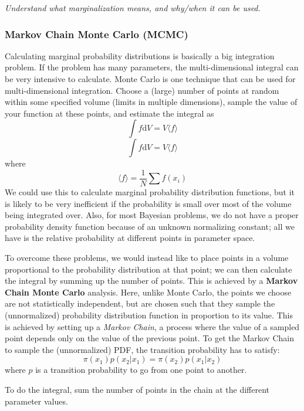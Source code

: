 \documentclass{article}
\newcommand{\test}[1]{%
    \begin{center}
        \colorbox{hl}{\parbox{0.9\textwidth}{\emph{\centering #1}}}
    \end{center}}
\begin{document}
\test{Understand what marginalization means, and why/when it can be used.}

\subsubsection{Markov Chain Monte Carlo (MCMC)}\label{mcmc} Calculating
marginal probability distributions is basically a big integration problem. If
the problem has many parameters, the multi-dimensional integral can be very
intensive to calculate. Monte Carlo is one technique that can be used for
multi-dimensional integration. Choose a (large) number of points at random
within some specified volume (limits in multiple dimensions), sample the value
of your function at these points, and estimate the integral as
\[
    \int{\! f \mathrm{d}V = V\langle f \rangle }
    \]
\[
    \int{ f \mathrm{d}V = V\langle f \rangle }
    \]
where
\[
    \langle f \rangle = \frac{1}{N}\sum{ f \left( x_{i} \right) }
    \]
We could use this to calculate marginal probability distribution functions, but
it is likely to be very inefficient if the probability is small over most of
the volume being integrated over. Also, for most Bayesian problems, we do not
have a proper probability density function because of an unknown normalizing
constant; all we have is the relative probability at different points in
parameter space.

To overcome these problems, we would instead like to place points in a volume
proportional to the probability distribution at that point; we can then
calculate the integral by summing up the number of points. This is achieved by
a \textbf{Markov Chain Monte Carlo} analysis. Here, unlike Monte Carlo, the
points we choose are not statistically independent, but are chosen such that
they sample the (unnormalized) probability distribution function in proportion
to its value. This is achieved by setting up a \textit{Markov Chain}, a process where
the value of a sampled point depends only on the value of the previous point.
To get the Markov Chain to sample the (unnormalized) PDF, the transition
probability has to satisfy:
\[
    \pi \left( x_{1} \right) p \left( x_{2}|x_{1} \right) =
    \pi \left( x_{2} \right) p \left( x_{1}|x_{2} \right)
    \]
where $p$ is a transition probability to go from one point to another.

To do the integral, sum the number of points in the chain at the different
parameter values.
\end{document}
